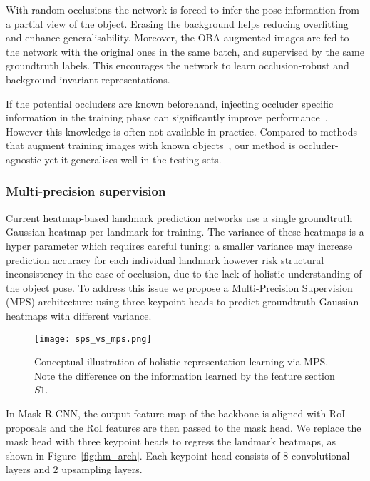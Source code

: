 \documentclass[10pt,twocolumn,letterpaper]{article}
\begin{document}
With random occlusions the network is forced to infer the pose information from a partial view of the object. Erasing the background helps reducing overfitting and enhance generalisability. Moreover, the OBA augmented images are fed to the network with the original ones in the same batch, and supervised by the same groundtruth labels. This encourages the network to learn occlusion-robust and background-invariant representations.

If the potential occluders are known beforehand, injecting  occluder specific information in the training phase can significantly improve performance~\cite{Oberweger2018making}. However this knowledge is often not available in practice. Compared to methods that augment training images with known objects~\cite{Jafari2018ipose, li2017deep, alhaija2017augmented}, our method is occluder-agnostic yet it generalises well in the testing sets. 


\subsubsection{Multi-precision supervision}

Current heatmap-based landmark prediction networks use a single groundtruth Gaussian heatmap per landmark for training. The variance of these heatmaps is a hyper parameter which requires careful tuning: a smaller variance may increase prediction accuracy for each individual landmark however risk structural inconsistency in the case of occlusion, due to the lack of holistic understanding of the object pose. To address this issue we propose a Multi-Precision Supervision (MPS) architecture: using three keypoint heads to predict groundtruth Gaussian heatmaps with different variance. 

\begin{figure}[t]
    \centering
    \texttt{[image: sps\_vs\_mps.png]}
    \caption{Conceptual illustration of holistic representation learning via MPS. Note the difference on the information learned by the feature section $S1$.}
    \label{fig:sps_vs_mps}
\end{figure}


In Mask R-CNN, the output feature map of the backbone is aligned with RoI proposals and the RoI features are then passed to the mask head. We replace the mask head with three keypoint heads to regress the landmark heatmaps, as shown in Figure~\ref{fig:hm_arch}. Each keypoint head consists of 8 convolutional layers and 2 upsampling layers. 
\end{document}
